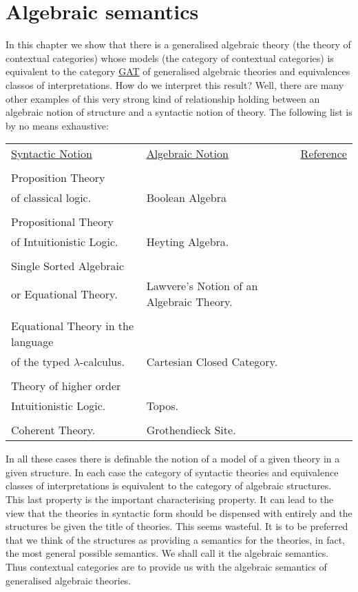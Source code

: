 
\section{Algebraic semantics} \label{sec:source-2-1}
In this chapter we show that there is a generalised algebraic theory (the theory
of contextual categories) whose models (the category of contextual categories)
is equivalent to the category \underline{GAT} of generalised algebraic theories
and equivalences classos of interpretations.
%
How do we interpret this result?
%
Well, there are many other examples of this very strong kind of relationship
holding between an algebraic notion of structure and a syntactic notion of
theory.
%
The following list is by no means exhaustive:
\begin{table}
  \centering
 \begin{tabular}{lll}
  \underline{Syntactic Notion} & \underline{Algebraic Notion} & \underline{Reference}\\
   & &\\
  Proposition Theory\\
   of classical logic. & Boolean Algebra & \\
   & & \\
  Propositional Theory\\
   of Intuitionistic Logic. & Heyting Algebra. & \\
   & & \\
  Single Sorted Algebraic\\
   or Equational Theory. & Lawvere's Notion of an Algebraic Theory. & \cite[II]{Lawvere} \\
   & & \\
  Equational Theory in the language\\
   of the typed $\lambda$-calculus. & Cartesian Closed Category. & \cite[26]{Myeres}\\
   & & \\
  Theory of higher order\\
   Intuitionistic Logic. & Topos. &\cite{Fourman} \\
   & & \\
  Coherent Theory. & Grothendieck Site. & \cite[28]{Reyes}
\end{tabular}
\end{table}

%
%

In all these cases there is definable the notion of a model of a given theory in
a given structure.
%
In each case the category of syntactic theories and equivalence classes of
interpretations is equivalent to the category of algebraic structures.
%
This last property is the important characterising property.
%
It can lead to the view that the theories in syntactic form should be dispensed
with entirely and the structures be given the title of theories.
%
This seems wasteful.
%
It is to be preferred that we think of the structures as providing a semantics
for the theories, in fact, the most general possible semantics.
%
We shall call it the algebraic semantics.
%
Thus contextual categories are to provide us with the algebraic semantics of
generalised algebraic theories.

